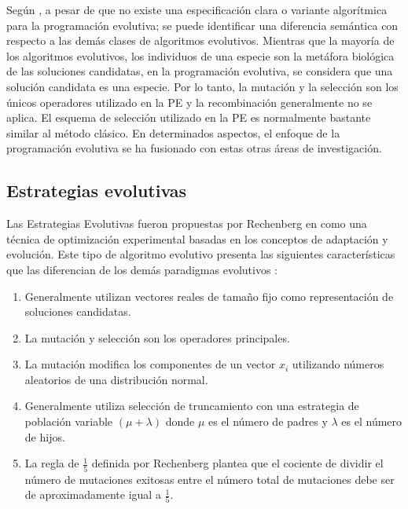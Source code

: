 Según \cite{weise2009global}, a pesar de que no existe una especificación clara o variante algorítmica para la programación evolutiva; se puede identificar una diferencia semántica con respecto a las demás clases de algoritmos evolutivos. Mientras que la mayoría de los algoritmos evolutivos, los individuos de una especie son la metáfora biológica de las soluciones candidatas, en la programación evolutiva, se considera que una solución candidata es una especie. Por lo tanto, la mutación y la selección son los únicos operadores utilizado en la PE y la recombinación generalmente no se aplica. El esquema de selección utilizado en la PE es normalmente bastante similar al método clásico. En determinados aspectos, el enfoque de la programación evolutiva se ha fusionado con estas otras áreas de investigación.


\subsection{Estrategias evolutivas}
Las Estrategias Evolutivas fueron propuestas por Rechenberg en \cite{rechenberg1973evolution} como una técnica de optimización experimental basadas en los conceptos de adaptación y evolución. Este tipo de algoritmo evolutivo presenta las siguientes características que las diferencian de los demás paradigmas evolutivos \cite{schwefel1995contemporary} \cite{weise2009global}:
\begin{enumerate}
\item Generalmente utilizan vectores reales de tamaño fijo como representación de soluciones candidatas.
\item La mutación y selección son los operadores principales.
\item La mutación modifica los componentes de un vector $x_i$ utilizando números aleatorios de una distribución normal.
\item Generalmente utiliza selección de truncamiento con una estrategia de población variable 
$(\mu+\lambda)$ donde $\mu$ es el número de padres y $\lambda$ es el número de hijos.
\item La regla de $\frac{1}{5}$ definida por Rechenberg plantea que el cociente de dividir el número de mutaciones exitosas entre el número total de mutaciones debe ser de aproximadamente igual a $\frac{1}{5}$. 
\end{enumerate}

